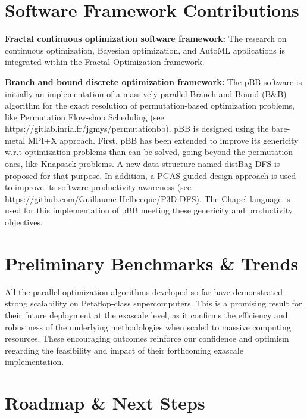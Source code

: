 %   

\section{Software Framework Contributions}
{\bf Fractal continuous optimization software framework:} The research on continuous optimization, Bayesian optimization, and AutoML applications is integrated within the Fractal Optimization framework.

\medskip

{\bf Branch and bound discrete optimization framework:} The pBB software is initially an implementation of a massively parallel Branch-and-Bound (B&B) algorithm for
the exact resolution of permutation-based optimization problems, like Permutation Flow-shop
Scheduling (see https://gitlab.inria.fr/jgmys/permutationbb). pBB is designed using
the bare-metal MPI+X approach. First, pBB has been extended to improve its genericity w.r.t
optimization problems than can be solved, going beyond the permutation ones, like Knapsack
problems. A new data structure named distBag-DFS is proposed for that purpose. In addition,
a PGAS-guided design approach is used to improve its software productivity-awareness (see
https://github.com/Guillaume-Helbecque/P3D-DFS). The Chapel language is used for this
implementation of pBB meeting these genericity and productivity objectives.

\medskip


\section{Preliminary Benchmarks \& Trends}

All the parallel optimization algorithms developed so far have demonstrated strong scalability on Petaflop-class supercomputers. This is a promising result for their future deployment at the exascale level, as it confirms the efficiency and robustness of the underlying methodologies when scaled to massive computing resources. These encouraging outcomes reinforce our confidence and optimism regarding the feasibility and impact of their forthcoming exascale implementation.

\section{Roadmap \& Next Steps}

